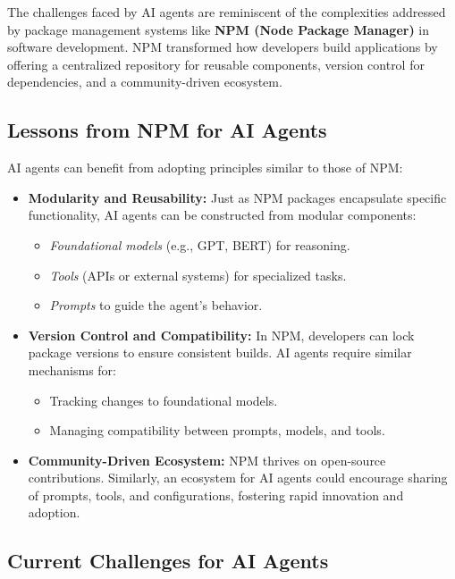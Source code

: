 \documentclass[12pt,twocolumn]{article}
\begin{document}
The challenges faced by AI agents are reminiscent of the complexities addressed by package management systems like \textbf{NPM (Node Package Manager)} in software development. NPM transformed how developers build applications by offering a centralized repository for reusable components, version control for dependencies, and a community-driven ecosystem.

\subsection{Lessons from NPM for AI Agents}

AI agents can benefit from adopting principles similar to those of NPM:

\begin{itemize}
    \item \textbf{Modularity and Reusability:} Just as NPM packages encapsulate specific functionality, AI agents can be constructed from modular components:
    \begin{itemize}
        \item \textit{Foundational models} (e.g., GPT, BERT) for reasoning.
        \item \textit{Tools} (APIs or external systems) for specialized tasks.
        \item \textit{Prompts} to guide the agent's behavior.
    \end{itemize}
    \item \textbf{Version Control and Compatibility:} In NPM, developers can lock package versions to ensure consistent builds. AI agents require similar mechanisms for:
    \begin{itemize}
        \item Tracking changes to foundational models.
        \item Managing compatibility between prompts, models, and tools.
    \end{itemize}
    \item \textbf{Community-Driven Ecosystem:} NPM thrives on open-source contributions. Similarly, an ecosystem for AI agents could encourage sharing of prompts, tools, and configurations, fostering rapid innovation and adoption.
\end{itemize}

\subsection{Current Challenges for AI Agents}
\end{document}
